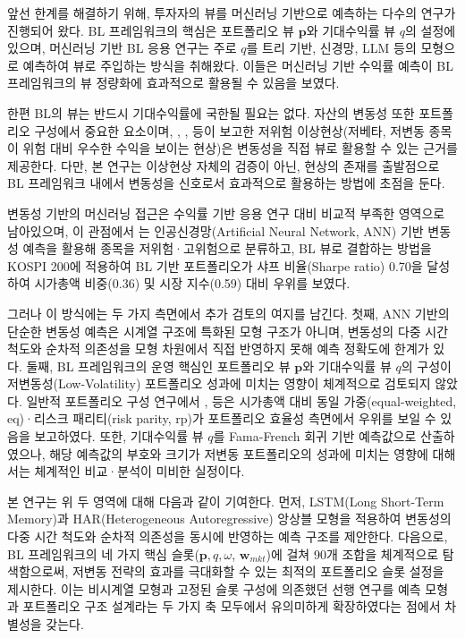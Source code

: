 \documentclass[eng]{kjas3}
\begin{document}
앞선 한계를 해결하기 위해, 투자자의 뷰를 머신러닝 기반으로 예측하는 다수의 연구가 진행되어 왔다. BL 프레임워크의 핵심은 포트폴리오 뷰 $\mathbf{p}$와 기대수익률 뷰 $q$의 설정에 있으며, 머신러닝 기반 BL 응용 연구는 주로 $q$를 트리 기반, 신경망, LLM 등의 모형으로 예측하여 뷰로 주입하는 방식을 취해왔다\citep{barua2023using, su2026objective, lee2025llm}. 이들은 머신러닝 기반 수익률 예측이 BL 프레임워크의 뷰 정량화에 효과적으로 활용될 수 있음을 보였다.

한편 BL의 뷰는 반드시 기대수익률에 국한될 필요는 없다. 자산의 변동성 또한 포트폴리오 구성에서 중요한 요소이며, \citet{baker2011}, \citet{frazzini2014}, \citet{blitz2007} 등이 보고한 저위험 이상현상(저베타, 저변동 종목이 위험 대비 우수한 수익을 보이는 현상)은 변동성을 직접 뷰로 활용할 수 있는 근거를 제공한다. 다만, 본 연구는 이상현상 자체의 검증이 아닌, 현상의 존재를 출발점으로 BL 프레임워크 내에서 변동성을 신호로서 효과적으로 활용하는 방법에 초점을 둔다.

변동성 기반의 머신러닝 접근은 수익률 기반 응용 연구 대비 비교적 부족한 영역으로 남아있으며, 이 관점에서 \citet{pyo2018}는 인공신경망(Artificial Neural Network, ANN) 기반 변동성 예측을 활용해 종목을 저위험·고위험으로 분류하고, BL 뷰로 결합하는 방법을 KOSPI 200에 적용하여 BL 기반 포트폴리오가 샤프 비율(Sharpe ratio) 0.70을 달성하여 시가총액 비중(0.36) 및 시장 지수(0.59) 대비 우위를 보였다.

그러나 이 방식에는 두 가지 측면에서 추가 검토의 여지를 남긴다. 첫째, ANN 기반의 단순한 변동성 예측은 시계열 구조에 특화된 모형 구조가 아니며, 변동성의 다중 시간 척도\citep{corsi2009}와 순차적 의존성을 모형 차원에서 직접 반영하지 못해 예측 정확도에 한계가 있다. 둘째, BL 프레임워크의 운영 핵심인 포트폴리오 뷰 $\mathbf{p}$와 기대수익률 뷰 $q$의 구성이 저변동성(Low-Volatility) 포트폴리오 성과에 미치는 영향이 체계적으로 검토되지 않았다. 일반적 포트폴리오 구성 연구에서 \citet{demiguel2009optimal}, \citet{maillard2010} 등은 시가총액 대비 동일 가중(equal-weighted, eq)·리스크 패리티(risk parity, rp)가 포트폴리오 효율성 측면에서 우위를 보일 수 있음을 보고하였다. 또한, 기대수익률 뷰 $q$를 Fama-French 회귀 기반 예측값으로 산출하였으나, 해당 예측값의 부호와 크기가 저변동 포트폴리오의 성과에 미치는 영향에 대해서는 체계적인 비교·분석이 미비한 실정이다. 

본 연구는 위 두 영역에 대해 다음과 같이 기여한다. 먼저, LSTM(Long Short-Term Memory)과 HAR(Heterogeneous Autoregressive) 앙상블 모형을 적용하여 변동성의 다중 시간 척도와 순차적 의존성을 동시에 반영하는 예측 구조를 제안한다. 다음으로, BL 프레임워크의 네 가지 핵심 슬롯($\mathbf{p}, q, \omega$, $\mathbf{w}_{mkt}$)에 걸쳐 90개 조합을 체계적으로 탐색함으로써, 저변동 전략의 효과를 극대화할 수 있는 최적의 포트폴리오 슬롯 설정을 제시한다. 이는 비시계열 모형과 고정된 슬롯 구성에 의존했던 선행 연구\citep{pyo2018}를 예측 모형과 포트폴리오 구조 설계라는 두 가지 축 모두에서 유의미하게 확장하였다는 점에서 차별성을 갖는다.
\end{document}
